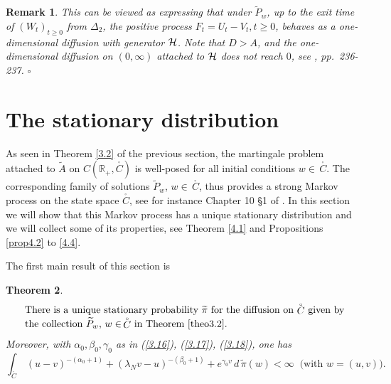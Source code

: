\documentclass[12pt,leqno]{article}
\def\IR{{\mathbb R}}
\def\n{\noindent}
\def\dis{\displaystyle}
\def\wt{\widetilde}
\def\cH{{\cal H}}
\newtheorem{theorem}{Theorem}[section]
\newtheorem{remark}[theorem]{Remark}
\begin{document}
\begin{remark}
\n
This can be viewed as expressing that under $\wt{P}_w$, up to the exit time of $(W_t)_{t \ge 0}$ from $\Delta_2$, the positive process $F_t = U_t - V_t, t \ge 0$, behaves as a one-dimensional diffusion with generator $\cH$. Note that $D > A$, and the one-dimensional diffusion on $(0,\infty)$ attached to $\cH$ does not reach $0$, see \cite{IkedWata89}, pp.~236-237. \hfill $\square$
\end{remark}


\section{The stationary distribution}
\setcounter{equation}{0}

As seen in Theorem \ref{3.2} of the previous section, the martingale problem attached to $\wt{A}$ on $C(\IR_+, \stackrel{_\circ}{C})$ is well-posed for all initial conditions $w \in \,\stackrel{_\circ}{C}$. The corresponding family of solutions $\wt{P}_w$, $w \in \, \stackrel{_\circ}{C}$, thus provides a strong Markov process on the state space $\stackrel{_\circ}{C}$, see for instance Chapter 10 \S 1 of \cite{StroVara79}. In this section we will show that this Markov process has a unique stationary distribution and we will collect some of its properties, see Theorem \ref{4.1} and Propositions \ref{prop4.2} to \ref{4.4}.

\medskip
The first main result of this section is
\begin{theorem}\label{theo4.1}
\begin{equation}\label{4.1}
\begin{array}{l}
\mbox{There is a unique stationary probability $\wt{\pi}$ for the diffusion on $\stackrel{_\circ}{C}$ given by}
\\
\mbox{the collection $\wt{P}_w$, $w \in\, \stackrel{_\circ}{C}$ in Theorem \ref{theo3.2}}.
\end{array}
\end{equation}
Moreover, with $\alpha_0, \beta_0, \gamma_0$ as in (\ref{3.16}), (\ref{3.17}), (\ref{3.18}), one has
\begin{equation}\label{4.2}
\dis\int_{\stackrel{_\circ}{C}} \,(u-v)^{-(\alpha_0 +1)} + (\lambda_N v - u)^{-(\beta_0 +1)} + e^{\gamma_0 v} \, d \,\wt{\pi}(w) < \infty \;\;\mbox{(with $w = (u,v)$)}.
\end{equation}
\end{theorem}
\end{document}
